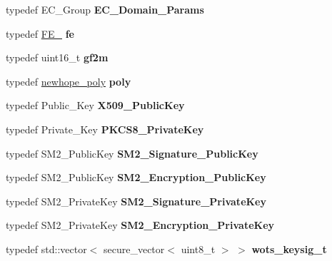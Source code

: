 \begin{DoxyCompactItemize}
typedef E\+C\+\_\+\+Group {\bfseries E\+C\+\_\+\+Domain\+\_\+\+Params}
\item 
\mbox{\label{namespace_botan_a65370c3e6d6f8d2656d7fa66213b20c9}} 
typedef \mbox{\hyperlink{class_botan_1_1_f_e__25519}{F\+E\+\_}} {\bfseries fe}
\item 
\mbox{\label{namespace_botan_af61fe047bd15ac9f2f4c57d42a4aaf09}} 
typedef uint16\+\_\+t {\bfseries gf2m}
\item 
\mbox{\label{namespace_botan_a0b75a8456bda4f7b38264e848a7f2936}} 
typedef \mbox{\hyperlink{class_botan_1_1newhope__poly}{newhope\+\_\+poly}} {\bfseries poly}
\item 
\mbox{\label{namespace_botan_add0fa31967ac5460a26278c11eb9142f}} 
typedef Public\+\_\+\+Key {\bfseries X509\+\_\+\+Public\+Key}
\item 
\mbox{\label{namespace_botan_aa653260f8a83c2d5905a709495f2b61c}} 
typedef Private\+\_\+\+Key {\bfseries P\+K\+C\+S8\+\_\+\+Private\+Key}
\item 
\mbox{\label{namespace_botan_a3e465e0eda1d2e69044658b6827ad417}} 
typedef S\+M2\+\_\+\+Public\+Key {\bfseries S\+M2\+\_\+\+Signature\+\_\+\+Public\+Key}
\item 
\mbox{\label{namespace_botan_a1d6a89815f08e0339626b3dc0f2e3bc1}} 
typedef S\+M2\+\_\+\+Public\+Key {\bfseries S\+M2\+\_\+\+Encryption\+\_\+\+Public\+Key}
\item 
\mbox{\label{namespace_botan_a352d0f7e1c0aa6e6363adb6b2371e15f}} 
typedef S\+M2\+\_\+\+Private\+Key {\bfseries S\+M2\+\_\+\+Signature\+\_\+\+Private\+Key}
\item 
\mbox{\label{namespace_botan_aa37405b19030e321df4154a1510ed88d}} 
typedef S\+M2\+\_\+\+Private\+Key {\bfseries S\+M2\+\_\+\+Encryption\+\_\+\+Private\+Key}
\item 
\mbox{\label{namespace_botan_a6adeb3982e716829a15535f6dfe5d831}} 
typedef std\+::vector$<$ secure\+\_\+vector$<$ uint8\+\_\+t $>$ $>$ {\bfseries wots\+\_\+keysig\+\_\+t}

\end{DoxyCompactItemize}
